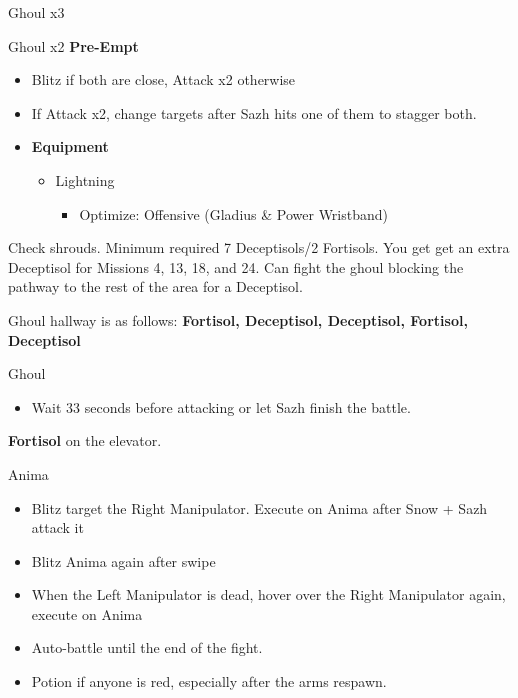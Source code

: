 	\begin{battle}[0:12]{Ghoul x3}
	\end{battle}

	\begin{battle}{Ghoul x2 \textbf{Pre-Empt}}
	\begin{itemize}
	    \item Blitz if both are close, Attack x2 otherwise
	    \item If Attack x2, change targets after Sazh hits one of them to stagger both.
	\end{itemize}
	\end{battle}

	
		\begin{menu}
		\begin{itemize}
			\item \textbf{Equipment}
			      \begin{itemize}
				      \item Lightning
				            \begin{itemize}
					            \item Optimize: Offensive (Gladius \& Power Wristband)
				            \end{itemize}
			      \end{itemize}
		\end{itemize}
	\end{menu}
	
	Check shrouds. Minimum required 7 Deceptisols/2 Fortisols. You get get an extra Deceptisol for Missions 4, 13, 18, and 24. Can fight the ghoul blocking the pathway to the rest of the area for a Deceptisol.

	Ghoul hallway is as follows: {\bf Fortisol, Deceptisol, Deceptisol, Fortisol, Deceptisol}

	\begin{battle}[0:33]{Ghoul}
		\begin{itemize}
			\item Wait 33 seconds before attacking or let Sazh finish the battle.
		\end{itemize}
	\end{battle}

	\textbf{Fortisol} on the elevator.

	\begin{battle}[0:54]{Anima}

		\begin{itemize}
		    \item Blitz target the Right Manipulator. Execute on Anima after Snow + Sazh attack it
		    \item Blitz Anima again after swipe
		    \item When the Left Manipulator is dead, hover over the Right Manipulator again, execute on Anima
		    \item Auto-battle until the end of the fight.
		    \item Potion if anyone is red, especially after the arms respawn.
		\end{itemize}
	\end{battle}



